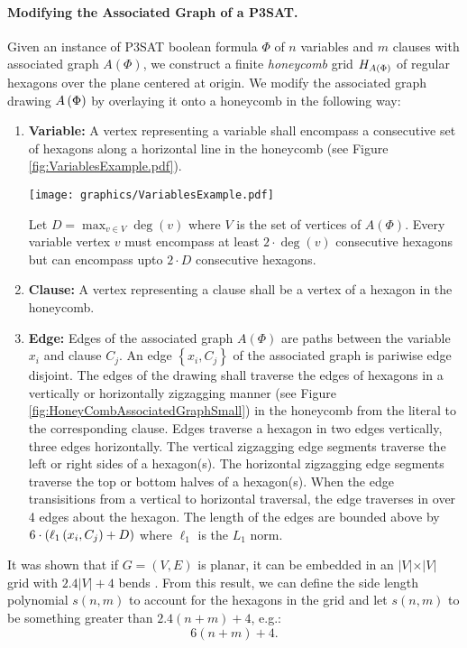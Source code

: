 \paragraph{Modifying the Associated Graph of a P3SAT.}

Given an instance of P3SAT boolean formula $\Phi$ of $n$ variables and $m$ clauses with associated graph $A(\Phi)$, we construct a finite \textit{honeycomb} grid $H_{A \left( \Phi \right)}$ of regular hexagons over the plane centered at origin.
We modify the associated graph drawing $A\left( \Phi \right)$ by overlaying it onto a honeycomb in the following way:

\begin{enumerate}
\item \textbf{Variable:} A vertex representing a variable shall encompass a consecutive set of hexagons along a horizontal line in the honeycomb (see Figure \ref{fig:VariablesExample.pdf}).

\begin{minipage}{\linewidth}
\begin{center}
\texttt{[image: graphics/VariablesExample.pdf]}
\label{fig:VariablesExample.pdf}
\end{center}
\end{minipage}

Let $D = \max_{v \in V} \deg(v)$ where $V$ is the set of vertices of $A(\Phi)$.
Every variable vertex $v$  must encompass at least $2 \cdot \deg(v)$ consecutive hexagons but can encompass upto $2 \cdot D$ consecutive hexagons.
\item \textbf{Clause:} A vertex representing a clause shall be a vertex of a hexagon in the honeycomb.
\item \textbf{Edge:} Edges of the associated graph $A(\Phi)$ are paths between the variable $x_i$ and clause $C_j$.  An edge $\left\lbrace x_i, C_j \right\rbrace$ of the associated graph is pariwise edge disjoint. 
The edges of the drawing shall traverse the edges of hexagons in a vertically or horizontally zigzagging manner (see Figure \ref{fig:HoneyCombAssociatedGraphSmall}) in the honeycomb from the literal to the corresponding clause. 
Edges traverse a hexagon in two edges vertically, three edges horizontally.  
The vertical zigzagging edge segments traverse the left or right sides of a hexagon(s).
The horizontal zigzagging edge segments traverse the top or bottom halves of a hexagon(s).
When the edge transisitions from a vertical to horizontal traversal, the edge traverses in over 4 edges about the hexagon.
The length of the edges are bounded above by $6 \cdot \left( \ell_1 \left( x_i,C_j \right) + D \right)$ where $\ell_1$ is the $L_1$ norm. 
\end{enumerate}
It was shown that if $G=(V,E)$ is planar, it can be embedded in an $\vert V \vert \times \vert V \vert$ grid with $2.4\vert V\vert + 4$ bends \cite{storer1984minimal,tamassia1987efficient}.
From this result, we can define the side length polynomial $s(n,m)$ to account for the hexagons in the grid and let $s(n,m)$ to be something greater than $2.4(n+m) + 4$, e.g.:
$$6 (n+m) + 4.$$


